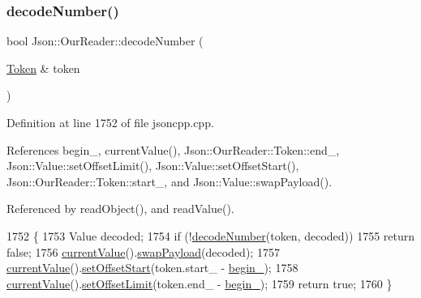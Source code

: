 \subsubsection{\texorpdfstring{decode\+Number()}{decodeNumber()}\hspace{0.1cm}{\footnotesize\ttfamily [1/2]}}
{\footnotesize\ttfamily bool Json\+::\+Our\+Reader\+::decode\+Number (\begin{DoxyParamCaption}\item[{\hyperlink{class_json_1_1_our_reader_1_1_token}{Token} \&}]{token }\end{DoxyParamCaption})\hspace{0.3cm}{\ttfamily [private]}}



Definition at line 1752 of file jsoncpp.\+cpp.



References begin\+\_\+, current\+Value(), Json\+::\+Our\+Reader\+::\+Token\+::end\+\_\+, Json\+::\+Value\+::set\+Offset\+Limit(), Json\+::\+Value\+::set\+Offset\+Start(), Json\+::\+Our\+Reader\+::\+Token\+::start\+\_\+, and Json\+::\+Value\+::swap\+Payload().



Referenced by read\+Object(), and read\+Value().


\begin{DoxyCode}
1752                                          \{
1753   Value decoded;
1754   \textcolor{keywordflow}{if} (!\hyperlink{class_json_1_1_our_reader_a272d271290933a89abfd5096dd69c9e9}{decodeNumber}(token, decoded))
1755     \textcolor{keywordflow}{return} \textcolor{keyword}{false};
1756   \hyperlink{class_json_1_1_our_reader_a2acd5b1d53e7d7e17c21ff8e96edc09d}{currentValue}().\hyperlink{class_json_1_1_value_a5263476047f20e2fc6de470e4de34fe5}{swapPayload}(decoded);
1757   \hyperlink{class_json_1_1_our_reader_a2acd5b1d53e7d7e17c21ff8e96edc09d}{currentValue}().\hyperlink{class_json_1_1_value_a92e32ea0f4f8a15853a3cf0beac9feb9}{setOffsetStart}(token.start\_ - \hyperlink{class_json_1_1_our_reader_a9bda9d72335d52cd06e65f9eca3f70f5}{begin\_});
1758   \hyperlink{class_json_1_1_our_reader_a2acd5b1d53e7d7e17c21ff8e96edc09d}{currentValue}().\hyperlink{class_json_1_1_value_a5e4f5853fec138150c5df6004a8c2bcf}{setOffsetLimit}(token.end\_ - \hyperlink{class_json_1_1_our_reader_a9bda9d72335d52cd06e65f9eca3f70f5}{begin\_});
1759   \textcolor{keywordflow}{return} \textcolor{keyword}{true};
1760 \}
\end{DoxyCode}
\mbox{\label{class_json_1_1_our_reader_a712270d53a2f023c2f406ac813548340}} 
